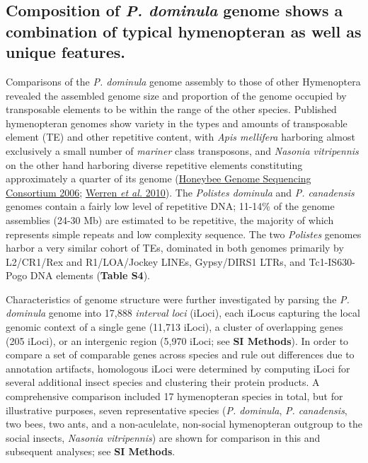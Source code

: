 \subsection{Composition of \textit{P. dominula} genome shows a combination of
typical hymenopteran as well as unique features.} Comparisons of the
\textit{P. dominula} genome assembly to those of other Hymenoptera
revealed the assembled genome size and proportion of the genome occupied
by transposable elements to be within the range of the other species.
Published hymenopteran genomes show variety in the types and amounts of
transposable element (TE) and other repetitive content, with \textit{Apis
mellifera} harboring almost exclusively a small number of \textit{mariner}
class transposons, and \textit{Nasonia vitripennis} on the other hand
harboring diverse repetitive elements constituting approximately a
quarter of its genome (\protect\hyperlink{ux5fENREFux5f20}{Honeybee
Genome Sequencing Consortium 2006};
\protect\hyperlink{ux5fENREFux5f70}{Werren \textit{et al.} 2010}). The
\textit{Polistes dominula} and \textit{P. canadensis} genomes contain a
fairly low level of repetitive DNA; 11-14\% of the genome assemblies
(24-30 Mb) are estimated to be repetitive, the majority of which
represents simple repeats and low complexity sequence. The two
\textit{Polistes} genomes harbor a very similar cohort of TEs, dominated
in both genomes primarily by L2/CR1/Rex and R1/LOA/Jockey LINEs,
Gypsy/DIRS1 LTRs, and Tc1-IS630-Pogo DNA elements (\textbf{Table S4}).

Characteristics of genome structure were further investigated by parsing
the \textit{P. dominula} genome into 17,888 \textit{interval loci} (iLoci),
each iLocus capturing the local genomic context of a single gene (11,713
iLoci), a cluster of overlapping genes (205 iLoci), or an intergenic
region (5,970 iLoci; see \textbf{SI Methods}). In order to compare a set
of comparable genes across species and rule out differences due to
annotation artifacts, homologous iLoci were determined by computing
iLoci for several additional insect species and clustering their protein
products. A comprehensive comparison included 17 hymenopteran species in
total, but for illustrative purposes, seven representative species
(\textit{P. dominula}, \textit{P. canadensis}, two bees, two ants, and a
non-aculelate, non-social hymenopteran outgroup to the social insects,
\textit{Nasonia vitripennis}) are shown for comparison in this and
subsequent analyses; see \textbf{SI Methods}.

